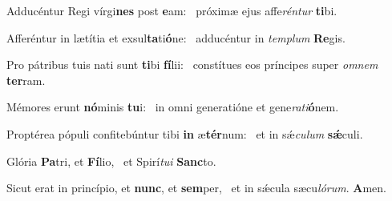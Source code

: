 \item Adducéntur Regi vírgi\textbf{nes} post \textbf{e}am:~\psstar{} próximæ ejus affe\textit{réntur} \textbf{ti}bi.
\item Afferéntur in lætítia et exsul\textbf{ta}ti\textbf{ó}ne:~\psstar{} adducéntur in \textit{templum} \textbf{Re}gis.
\item Pro pátribus tuis nati sunt \textbf{ti}bi \textbf{fí}lii:~\psstar{} constítues eos príncipes super \textit{omnem} \textbf{ter}ram.
\item Mémores erunt \textbf{nó}minis \textbf{tu}i:~\psstar{} in omni generatióne et gene\textit{rati}\textbf{ó}nem.
\item Proptérea pópuli confitebúntur tibi \textbf{in} æ\textbf{tér}num:~\psstar{} et in sǽ\textit{culum} \textbf{sǽ}culi.
\item Glória \textbf{Pa}tri, et \textbf{Fí}lio,~\psstar{} et Spirí\textit{tui} \textbf{Sanc}to.
\item Sicut erat in princípio, et \textbf{nunc}, et \textbf{sem}per,~\psstar{} et in sǽcula sæcu\textit{lórum}. \textbf{A}men.
